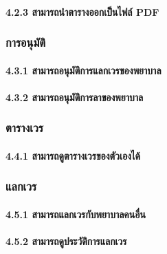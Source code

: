 \hspace{2.5cm}\paragraph{4.2.3 สามารถนำตารางออกเป็นไฟล์ PDF}

\hspace{1cm}\subsubsection{การอนุมัติ}

\hspace{2.5cm}\paragraph{4.3.1 สามารถอนุมัติการแลกเวรของพยาบาล}

\hspace{2.5cm}\paragraph{4.3.2 สามารถอนุมัติการลาของพยาบาล}

\hspace{1cm}\subsubsection{ตารางเวร}

\hspace{2.5cm}\paragraph{4.4.1 สามารถดูตารางเวรของตัวเองได้}

\hspace{1cm}\subsubsection{แลกเวร}

\hspace{2.5cm}\paragraph{4.5.1 สามารถแลกเวรกับพยาบาลคนอื่น}

\hspace{2.5cm}\paragraph{4.5.2 สามารถดูประวัติการแลกเวร}

